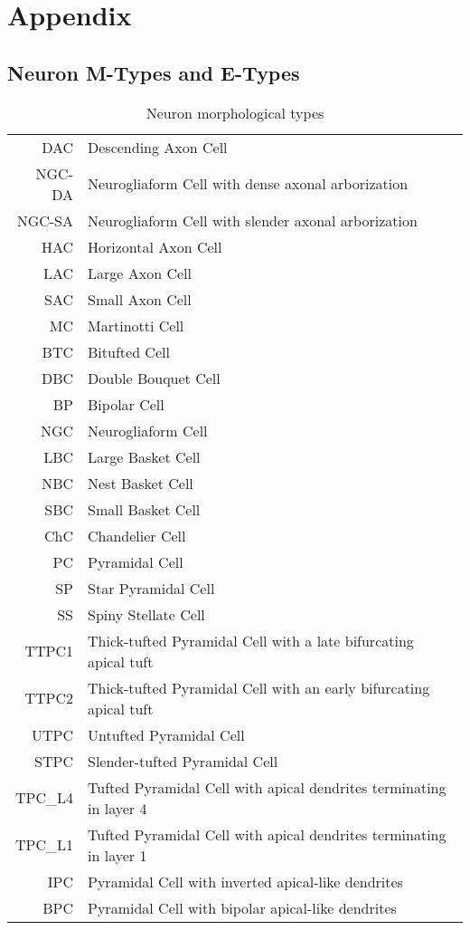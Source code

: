 \chapter{Appendix}

\section{Neuron M-Types and E-Types}
\begin{table}[h]
    \begin{tabular}{r|l}
        DAC & Descending Axon Cell\\
        NGC-DA & Neurogliaform Cell with dense axonal arborization\\
        NGC-SA & Neurogliaform Cell with slender axonal arborization\\
        HAC & Horizontal Axon Cell\\
        LAC & Large Axon Cell\\
        SAC & Small Axon Cell\\
        MC & Martinotti Cell\\
        BTC & Bitufted Cell\\
        DBC & Double Bouquet Cell\\
        BP & Bipolar Cell\\
        NGC & Neurogliaform Cell\\
        LBC & Large Basket Cell\\
        NBC & Nest Basket Cell\\
        SBC & Small Basket Cell \\
        ChC & Chandelier Cell\\
        PC & Pyramidal Cell\\
        SP & Star Pyramidal Cell\\
        SS & Spiny Stellate Cell\\
        TTPC1 & Thick-tufted Pyramidal Cell with a late bifurcating apical tuft\\
        TTPC2 & Thick-tufted Pyramidal Cell with an early bifurcating apical tuft\\
        UTPC & Untufted Pyramidal Cell\\
        STPC & Slender-tufted Pyramidal Cell\\
        TPC\_L4 & Tufted Pyramidal Cell with apical dendrites terminating in layer 4\\
        TPC\_L1 & Tufted Pyramidal Cell with apical dendrites terminating in layer 1\\
        IPC & Pyramidal Cell with inverted apical-like dendrites\\
        BPC & Pyramidal Cell with bipolar apical-like dendrites\\
    \end{tabular}
    \caption{Neuron morphological types}
    \label{tab:m-type_table}
\end{table}

